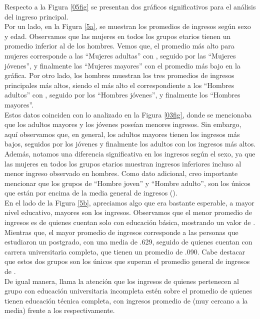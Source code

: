 \documentclass{article}
\begin{document}
	\FloatBarrier
	
	Respecto a la Figura \ref{05fig} se presentan dos gráficos significativos para el análisis del ingreso principal.\\
	
	Por un lado, en la Figura \ref{5a}, se muestran los promedios de ingresos según sexo y edad. Observamos que las mujeres en todos los grupos etarios tienen un promedio inferior al de los hombres. Vemos que, el promedio más alto para mujeres corresponde a las “Mujeres adultas” con , seguido por las “Mujeres jóvenes”, y finalmente las “Mujeres mayores” con el promedio más bajo en la gráfica. Por otro lado, los hombres muestran los tres promedios de ingresos principales más altos, siendo el más alto el correspondiente a los “Hombres adultos” con , seguido por los “Hombres jóvenes”, y finalmente los “Hombres mayores”.\\
	
	Estos datos coinciden con lo analizado en la Figura \ref{03fig}, donde se mencionaba que los adultos mayores y los jóvenes poseían menores ingresos. Sin embargo, aquí observamos que, en general, los adultos mayores tienen los ingresos más bajos, seguidos por los jóvenes y finalmente los adultos con los ingresos más altos. Además, notamos una diferencia significativa en los ingresos según el sexo, ya que las mujeres en todos los grupos etarios muestran ingresos inferiores incluso al menor ingreso observado en hombres. Como dato adicional, creo importante mencionar que los grupos de “Hombre joven” y “Hombre adulto”, son los únicos que están por encima de la media general de ingresos ().\\
	
	En el lado de la Figura \ref{5b}, apreciamos algo que era bastante esperable, a mayor nivel educativo, mayores son los ingresos. Observamos que el menor promedio de ingresos es de quienes cuentan solo con educación básica, mostrando un valor de . Mientras que, el mayor promedio de ingresos corresponde a las personas que estudiaron un postgrado, con una media de .629, seguido de quienes cuentan con carrera universitaria completa, que tienen un promedio de .090. Cabe destacar que estos dos grupos son los únicos que superan el promedio general de ingresos de .\\
	
	De igual manera, llama la atención que los ingresos de quienes pertenecen al grupo con educación universitaria incompleta estén sobre el promedio de quienes tienen educación técnica completa, con ingresos promedio de  (muy cercano a la media) frente a los  respectivamente.\\
	
\end{document}
